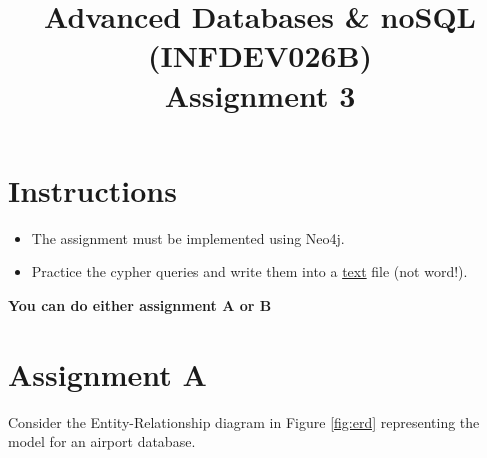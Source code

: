 \documentclass[10pt,a4paper]{article}
\title{Advanced Databases \& noSQL (INFDEV026B) \\ Assignment 3}
\author { }
\date { }
\begin{document}
\maketitle

\section*{Instructions}
\begin{itemize}[noitemsep]
\item The assignment must be implemented using Neo4j.
\item Practice the cypher queries and write them into a \underline{text} file (not word!).
\end{itemize}

\textbf{You can do either assignment A or B}

\section*{Assignment A}
Consider the Entity-Relationship diagram in Figure \ref{fig:erd} representing the model for an airport database.
\end{document}
